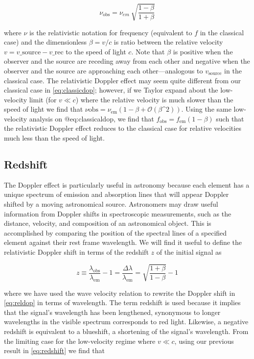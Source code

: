 \begin{equation}\nu_\text{obs} = \nu_{em}\ \sqrt{\frac{1- \beta}{1 + \beta}}\label{eq:reldop}\end{equation}

where \(\nu\) is the relativistic notation for frequency (equivalent to
\(f\) in the classical case) and the dimensionless \(\beta = v/c\) is
ratio between the relative velocity \( v = v\_\text{source} -
v\_\text{rec}\) to the speed of light \(c\). Note that \(\beta\) is
positive when the observer and the source are receding away from each
other and negative when the observer and the source are approaching each
other---analogous to \(v_\text{source}\) in the classical case. The
relativistic Doppler effect may seem quite different from our classical
case in \cref{eq:classicdop}; however, if we Taylor expand
about the low-velocity limit (for \(v \ll c\)) where the relative
velocity is much slower than the speed of light we find that
\(\nu\text{obs} = \nu_\text{em} \left( 1 - \beta +
\mathcal{O}(\beta\^{}2) \right) \). Using the same low-velocity analysis
on @eq:classicaldop, we find that
\(f_\text{obs} = f_\text{em} \left( 1 - \beta \right)\) such that the
relativistic Doppler effect reduces to the classical case for relative
velocities much less than the speed of light.

\subsection{Redshift}\label{redshift}

The Doppler effect is particularly useful in astronomy because each
element has a unique spectrum of emission and absorption lines that will
appear Doppler shifted by a moving astronomical source. Astronomers may
draw useful information from Doppler shifts in spectroscopic
measurements, such as the distance, velocity, and composition of an
astronomical object. This is accomplished by comparing the position of
the spectral lines of a specified element against their rest frame
wavelength. We will find it useful to define the relativistic Doppler
shift in terms of the redshift \(z\) of the initial signal as

\begin{equation}z \equiv \frac{ \lambda_\text{obs}}{\lambda_\text{em}} - 1 =  \frac{\Delta\lambda}{\lambda_\text{em}} = \sqrt{\frac{1 + \beta}{1-\beta}} - 1\label{eq:redshift}\end{equation}

where we have used the wave velocity relation to rewrite the Doppler
shift in \cref{eq:reldop} in terms of wavelength. The term
redshift is used because it implies that the signal's wavelength has
been lengthened, synonymous to longer wavelengths in the visible
spectrum corresponds to red light. Likewise, a negative redshift is
equivalent to a blueshift, a shortening of the signal's wavelength. From
the limiting case for the low-velocity regime where \(v \ll c\), using
our previous result in \cref{eq:redshift} we find that


